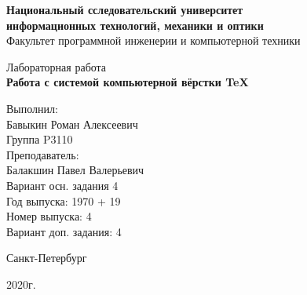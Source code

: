 \thispagestyle{empty}
\begin{center}
    {\bfseries Национальный сследовательский университет \\
    информационных технологий, механики и оптики}\\
    Факультет программной инженерии и компьютерной техники

    \vspace{20em}

    {\large Лабораторная работа }\\
    {\Large \textbf{Работа с системой компьютерной вёрстки \TeX}}
\end{center}

\vspace{15em}

\begin{flushright}
    Выполнил:\\
    Бавыкин Роман Алексеевич\\
    Группа P3110\\
    Преподаватель:\\
    Балакшин Павел Валерьевич\\
    Вариант осн. задания 4\\
    Год выпуска: 1970 + 19\\
    Номер выпуска: 4 \\
    Вариант доп. задания: 4 
\end{flushright}

\vspace{\fill}

\begin{center}
Санкт-Петербург

2020г.
\end{center}

